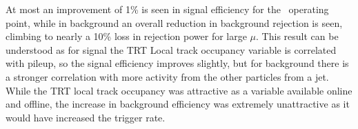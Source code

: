 At most an improvement of 1\% is seen in signal efficiency for the \Tight\ operating point, while in background an overall reduction in background rejection is seen, climbing to nearly a 10\% loss in rejection power for large $\mu$.
This result can be understood as for signal the TRT Local track occupancy variable is correlated with pileup, so the signal efficiency improves slightly, but for background there is a stronger correlation with more activity from the other particles from a jet.
While the TRT local track occupancy was attractive as a variable available online and offline, the increase in background efficiency was extremely unattractive as it would have increased the trigger rate.


